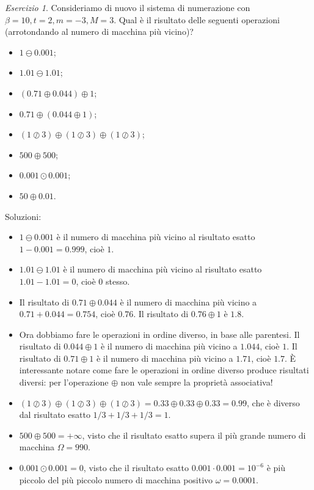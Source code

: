 \documentclass[a4paper]{report}
\theoremstyle{definiton}
\theoremstyle{remark}
\newtheorem{esercizio}[theorem]{Esercizio}
\begin{document}
\begin{esercizio} \label{ese: miscellanea numeri di macchina}
Consideriamo di nuovo il sistema di numerazione con $\beta=10, t=2, m=-3, M=3$. Qual è il risultato delle seguenti operazioni (arrotondando al numero di macchina più vicino)? 
\begin{itemize}
    \item $1 \ominus 0.001$;
    \item $1.01 \ominus 1.01$;
    \item $(0.71 \oplus 0.044) \oplus 1$;
    \item $0.71 \oplus (0.044 \oplus 1)$;
    \item $(1 \oslash 3) \oplus (1 \oslash 3) \oplus (1 \oslash 3)$;
    \item $500 \oplus 500$; 
    \item $0.001 \odot 0.001$;
    \item $50 \oplus 0.01$.
\end{itemize}
\end{esercizio}
Soluzioni:
\begin{itemize}
    \item $1 \ominus 0.001$ è il numero di macchina più vicino al risultato esatto $1 - 0.001 = 0.999$, cioè $1$.
    \item $1.01 \ominus 1.01$ è il numero di macchina più vicino  al risultato esatto $1.01-1.01 = 0$, cioè $0$ stesso.
    \item Il risultato di $0.71 \oplus 0.044$ è il numero di macchina più vicino a $0.71+0.044 = 0.754$, cioè $0.76$. Il risultato di $ 0.76\oplus 1$ è $1.8$.
    \item Ora dobbiamo fare le operazioni in ordine diverso, in base alle parentesi. Il risultato di $0.044 \oplus 1$ è il numero di macchina più vicino a $1.044$, cioè $1$. Il risultato di $0.71\oplus 1$ è il numero di macchina più vicino a $1.71$, cioè $1.7$. È interessante notare come fare le operazioni in ordine diverso produce risultati diversi: per l'operazione $\oplus$ non vale sempre la proprietà associativa!
    \item $(1 \oslash 3) \oplus (1 \oslash 3) \oplus (1 \oslash 3) = 0.33 \oplus 0.33 \oplus 0.33 = 0.99$, che è diverso dal risultato esatto $1/3 + 1/3 + 1/3 = 1$.
    \item $500 \oplus 500 = +\infty$, visto che il risultato esatto supera il più grande numero di macchina $\Omega = 990$.
    \item $0.001 \odot 0.001 = 0$, visto che il risultato esatto $0.001 \cdot 0.001 = 10^{-6}$ è più piccolo del più piccolo numero di macchina positivo $\omega = 0.0001$.
\end{itemize}
\end{document}
